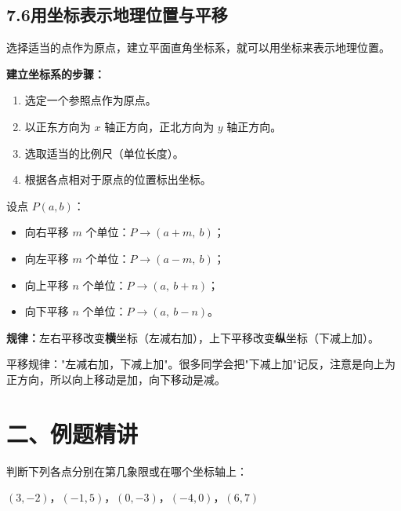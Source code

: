 \documentclass[12pt, a4paper]{ctexart}
\begin{document}
\subsection*{7.6\quad 用坐标表示地理位置与平移}

\begin{knowledgebox}[用坐标表示地理位置]
选择适当的点作为原点，建立平面直角坐标系，就可以用坐标来表示地理位置。

\medskip
\textbf{建立坐标系的步骤：}
\begin{enumerate}[leftmargin=1.5em]
  \item 选定一个参照点作为原点。
  \item 以正东方向为 $x$ 轴正方向，正北方向为 $y$ 轴正方向。
  \item 选取适当的比例尺（单位长度）。
  \item 根据各点相对于原点的位置标出坐标。
\end{enumerate}
\end{knowledgebox}

\begin{knowledgebox}[用坐标表示平移]
设点 $P(a, b)$：
\begin{itemize}[leftmargin=1.5em]
  \item 向右平移 $m$ 个单位：$P \to (a + m,\ b)$；
  \item 向左平移 $m$ 个单位：$P \to (a - m,\ b)$；
  \item 向上平移 $n$ 个单位：$P \to (a,\ b + n)$；
  \item 向下平移 $n$ 个单位：$P \to (a,\ b - n)$。
\end{itemize}

\medskip
\textbf{规律：}左右平移改变\textbf{横}坐标（左减右加），上下平移改变\textbf{纵}坐标（下减上加）。
\end{knowledgebox}

\begin{warnbox}[易错提醒]
平移规律："左减右加，下减上加"。很多同学会把"下减上加"记反，注意是向上为正方向，所以向上移动是加，向下移动是减。
\end{warnbox}

\section*{\textcolor{examorange}{二、例题精讲}}

\begin{examplebox}[【例题1】判断点所在的象限]
判断下列各点分别在第几象限或在哪个坐标轴上：

$(3, -2)$，\quad $(-1, 5)$，\quad $(0, -3)$，\quad $(-4, 0)$，\quad $(6, 7)$
\end{examplebox}
\end{document}
